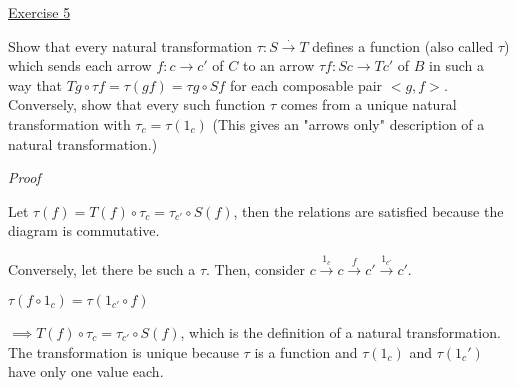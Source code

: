 \noindent
\underline{Exercise 5}
\vspace{2mm}

Show that every natural transformation $\tau : S \xrightarrow{.} T$ defines a function (also called $\tau$)
which sends each arrow $f: c \to c'$ of $C$ to an arrow $\tau f: Sc \to Tc'$ of $B$ in such a
way that $Tg \circ \tau f = \tau(gf) = \tau g \circ Sf$ for each composable pair $<g, f>$. Conversely,
show that every such function $\tau$ comes from a unique natural transformation
with $\tau_c = \tau(1_c)$ (This gives an "arrows only" description of a natural transformation.)

\vspace{2mm}

\noindent
\emph{Proof}

Let $\tau(f) = T(f) \circ \tau_c = \tau_{c'} \circ S(f)$, then the relations are satisfied because the diagram is commutative. 

Conversely, let there be such a $\tau$. Then, consider $c \xrightarrow{1_c} c \xrightarrow{f} c' \xrightarrow{1_{c'}} c'$. 

$\tau(f \circ 1_c) = \tau(1_{c'} \circ f)$

$\implies T(f) \circ \tau_c = \tau_{c'} \circ S(f)$, which is the definition of a natural transformation. The transformation is unique because $\tau$ is a function and $\tau(1_c)$ and $\tau(1_c')$ have only one value each.

\vspace{2mm}
